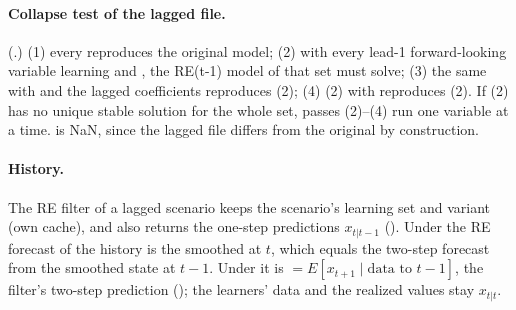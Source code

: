 \documentclass[11pt,a4paper]{article}
\begin{document}
\paragraph{Collapse test of the lagged file.} (.) (1) every
 reproduces the original model; (2) with every lead-1 forward-looking variable
learning and , the RE(t-1) model of that set must solve; (3) the same
with  and the lagged coefficients reproduces (2); (4) (2) with
 reproduces (2). If (2) has no unique stable solution for the whole
set, passes (2)--(4) run one variable at a time.  is NaN, since the
lagged file differs from the original by construction.

\paragraph{History.} The RE filter of a lagged scenario keeps the scenario's learning set and
variant (own cache), and also returns the one-step predictions $x_{t|t-1}$ ().
Under  the RE forecast of the history is the smoothed
 at $t$, which equals the two-step forecast from the smoothed state at $t-1$.
Under  it is 
$= E[x_{t+1}\mid\text{data to } t-1]$, the filter's two-step prediction
(); the learners' data and the realized values stay $x_{t|t}$.
\end{document}
